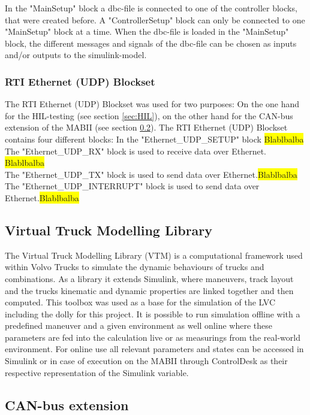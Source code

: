 \documentclass[ExampleMasters.tex]{subfiles}
\begin{document}
In the "MainSetup" block a dbc-file is connected to one of the controller blocks, that were created before. A "ControllerSetup" block can only be connected to one "MainSetup" block at a time. When the dbc-file is loaded in the "MainSetup" block, the different messages and signals of the dbc-file can be chosen as inputs and/or outputs to the simulink-model.\\
\subsubsection{RTI Ethernet (UDP) Blockset}
The RTI Ethernet (UDP) Blockset was used for two purposes: On the one hand for the HIL-testing (see section \ref{sec:HIL}), on the other hand for the CAN-bus extension of the MABII (see section \ref{sec:can_bus_extension_software}). The RTI Ethernet (UDP) Blockset contains four different blocks:
In the "Ethernet\_UDP\_SETUP" block \colorbox{yellow}{Blablbalba}\\
The "Ethernet\_UDP\_RX" block is used to receive data over Ethernet. \colorbox{yellow}{Blablbalba}\\
The "Ethernet\_UDP\_TX" block is used to send data over Ethernet.\colorbox{yellow}{Blablbalba}\\
The "Ethernet\_UDP\_INTERRUPT" block is used to send data over Ethernet.\colorbox{yellow}{Blablbalba}\\
\subsection{Virtual Truck Modelling Library}
\label{sec:VTM}
The Virtual Truck Modelling Library (VTM) is a computational framework used within Volvo Trucks to simulate the dynamic behaviours of trucks and combinations. As a library it extends Simulink, where maneuvers, track layout and the trucks kinematic and dynamic properties are linked together and then computed. This toolbox was used as a base for the simulation of the LVC including the dolly for this project. It is possible to run simulation offline with a predefined maneuver and a given environment as well online where these parameters are fed into the calculation live or as measurings from the real-world environment. For online use all relevant parameters and states can be accessed in Simulink or in case of execution on the MABII through ControlDesk as their respective representation of the Simulink variable. 

\subsection{CAN-bus extension}
\label{sec:can_bus_extension_software}
\end{document}
